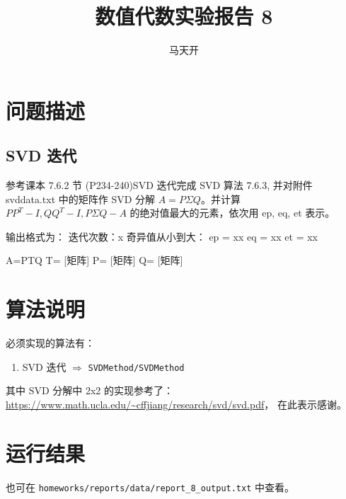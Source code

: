 \documentclass{article}
\title{数值代数实验报告 8}
\author{马天开}
\newenvironment{metaverbatim}{\verbatim}{\endverbatim}
\begin{document}
\maketitle

\section{问题描述}

\subsection{SVD 迭代}

参考课本 7.6.2 节 (P234-240)SVD 迭代完成 SVD 算法 7.6.3, 并对附件 svddata.txt 中的矩阵作 SVD 分解 $A = P\Sigma Q$。并计算 $PP^T-I, QQ^T-I, P\Sigma Q-A$ 的绝对值最大的元素，依次用 ep, eq, et 表示。

\begin{metaverbatim}
输出格式为：
迭代次数：x
奇异值从小到大：
ep = xx
eq = xx
et = xx

A=PTQ
T= [矩阵]
P= [矩阵]
Q= [矩阵]
\end{metaverbatim}


\section{算法说明}

必须实现的算法有：

\begin{enumerate}
    \item SVD 迭代 $\Rightarrow$ \verb|SVDMethod/SVDMethod|
\end{enumerate}

其中 SVD 分解中 2x2 的实现参考了：
\url{https://www.math.ucla.edu/~cffjiang/research/svd/svd.pdf}，
在此表示感谢。

\section{运行结果}

也可在 \verb|homeworks/reports/data/report_8_output.txt| 中查看。



\newpage
\end{document}
